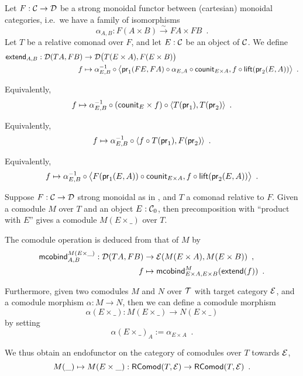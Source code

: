 \documentclass{amsart}
\begin{document}
\begin{definition}\label{def:extend}
 Let $F : \C\to \D$ be a strong monoidal functor between (cartesian) monoidal categories, 
 i.e.\ we have a family of isomorphisms
  \[ \alpha_{A,B} : F(A\times B) \stackrel{\sim}{\to} FA\times FB\enspace . \] 
  Let $T$ be a relative comonad over $F$, and let $E : \C$ be an object of $\C$.
 We define
 \begin{align*} \extend_{A,B} : \D(TA,FB) &\to \D\bigl(T(E\times A),F(E\times B)\bigr)\\
                                   f   &\mapsto \comp{\bigl\langle \comp{\counit_{E\times A}}{\comp{\alpha_{E,A}}{\pr_1(FE,FA)}}, \comp{\lift(\pr_2(E,A))}{f} \bigr\rangle}{\alpha_{E,B}^{-1}} \enspace .
\end{align*}

Equivalently,
  \[ f   \mapsto \comp{\comp{\langle T(\pr_1) , T(\pr_2) \rangle}{(\counit_E\times f)}}{\alpha_{E,B}^{-1}} \enspace .
  \]

  
Equivalently,
  \[ f   \mapsto \comp{\langle \comp{T(\pr_1)}{f} , F(\pr_2) \rangle}{\alpha_{E,B}^{-1}} \enspace .
  \]
  
Equivalently,
  \[f  \mapsto \comp{\bigl\langle \comp{\counit_{E\times A}}{F(\pr_1(E,A))}, \comp{\lift(\pr_2(E,A))}{f} \bigr\rangle}{\alpha_{E,B}^{-1}} \enspace .
  \]
\end{definition}



\begin{definition}\label{def:product_in_context}
 Suppose $F:\C\to\D$ strong monoidal as in , and $T$ a comonad relative to $F$.
 Given a comodule $M$ over $T$ and an object $E:\C_0$, then precomposition with \enquote{product with $E$}
 gives a comodule $M(E\times\_)$ over $T$.
 
 The comodule operation is deduced from that of $M$ by 
 \begin{align*} \mcobind^{M(E\times\_)}_{A,B} : \D(TA,FB)&\to \E(M(E\times A), M(E\times B)) \enspace ,\\
                                                      f &\mapsto \mcobind^M_{E\times A,E\times B}(\extend(f)) \enspace .
  \end{align*}                                        

 \noindent
 Furthermore, given two comodules $M$ and $N$ over $\T$ with target category $\E$, and a comodule morphism $\alpha : M \to N$, then 
 we can define a comodule morphism \[\alpha(E\times \_) : M(E\times \_) \to N(E\times \_) \] by setting
          \[ \alpha(E \times \_)_A := \alpha_{E\times A} \enspace . \]
  
  \noindent
  We thus obtain an endofunctor on the category of comodules over $T$ towards $\E$,
   \[ M(\_) \mapsto  M (E\times \_) : \RComod(T,\E) \to \RComod(T,\E) \enspace . \]
 

\end{definition}
\end{document}
